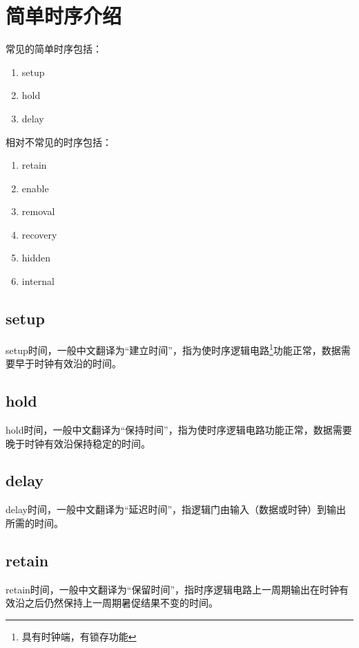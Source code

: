\section{简单时序介绍}
常见的简单时序包括：
\begin{enumerate}
  \item setup
  \item hold
  \item delay
\end{enumerate}

相对不常见的时序包括：
\begin{enumerate}
  \item retain
  \item enable
  \item removal
  \item recovery
  \item hidden
  \item internal
\end{enumerate}
\subsection{setup}
setup时间，一般中文翻译为“建立时间”，指为使时序逻辑电路\footnote{具有时钟端，有锁存功能}功能正常，数据需要早于时钟有效沿的时间。
\subsection{hold}
hold时间，一般中文翻译为“保持时间”，指为使时序逻辑电路功能正常，数据需要晚于时钟有效沿保持稳定的时间。
\subsection{delay}
delay时间，一般中文翻译为“延迟时间”，指逻辑门由输入（数据或时钟）到输出所需的时间。
\subsection{retain}
retain时间，一般中文翻译为“保留时间”，指时序逻辑电路上一周期输出在时钟有效沿之后仍然保持上一周期暑促结果不变的时间。
